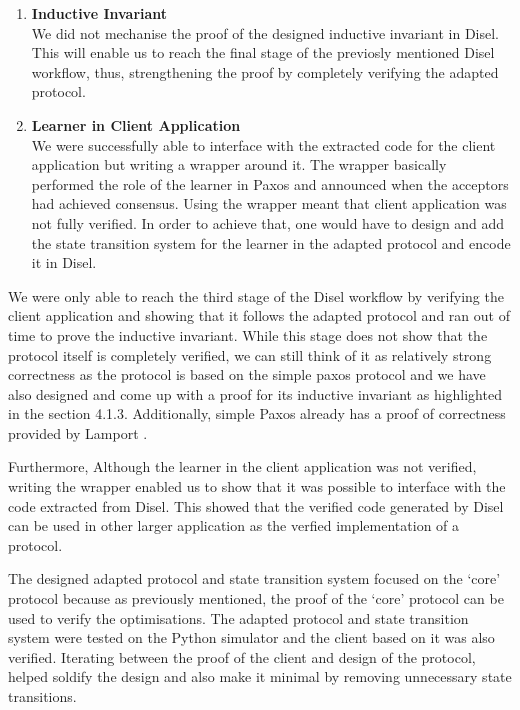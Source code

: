 \begin{enumerate}
  \item \textbf{Inductive Invariant} \\
    We did not mechanise the proof of the designed inductive invariant in Disel.
    This will enable us to reach the final stage of the previosly mentioned Disel workflow,
    thus, strengthening the proof by completely verifying the adapted protocol.
  \item \textbf{Learner in Client Application} \\
    We were successfully able to interface with the extracted code for the client
    application but writing a wrapper around it. The wrapper basically performed
    the role of the learner in Paxos and announced when the acceptors had
    achieved consensus. Using the wrapper meant that client application was not
    fully verified. In order to achieve that, one would have to design and add the
    state transition system for the learner in the adapted protocol and encode it
    in Disel.
\end{enumerate}

We were only able to reach the third stage of the Disel workflow by
verifying the client application and showing that it follows the
adapted protocol and ran out of time to prove the inductive invariant.
While this stage does not show that the protocol itself
is completely verified, we can still think of it as relatively strong
correctness as the protocol is based on the simple paxos protocol and
we have also designed and come up with a proof for its inductive invariant
as highlighted in the section 4.1.3. Additionally, simple Paxos already has
a proof of correctness provided by Lamport \cite{4}.

Furthermore, Although the learner in the client application was not verified,
writing the
wrapper enabled us to show that it was possible to interface with the code
extracted from Disel. This showed that the verified code generated by Disel
can be used in other larger application as the verfied implementation of
a protocol.

The designed adapted protocol and state transition system focused on
the `core' protocol because as previously mentioned, the proof of the `core'
protocol can be used to verify the optimisations. The adapted protocol and
state transition system were tested on the Python simulator and the client
based on it was also verified. Iterating between the proof of the client
and design of the protocol, helped soldify the design and also make it
minimal by removing unnecessary state transitions.

